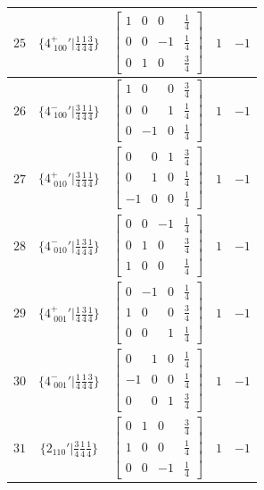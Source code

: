 \documentclass[fleqn,8pt]{jsarticle}
\begin{document}
\begin{longtable}{ccccc}
$ 25 $ & $ \{4^{+}_{\,\,100}{}'|\frac{1}{4} \frac{1}{4} \frac{3}{4}\} $ & $ \begin{bmatrix} 1 & 0 & 0 & \frac{1}{4} \\ 0 & 0 & -1 & \frac{1}{4} \\ 0 & 1 & 0 & \frac{3}{4} \end{bmatrix} $ & $ 1 $ & $ -1 $ \\ \hline
$ 26 $ & $ \{4^{-}_{\,\,100}{}'|\frac{3}{4} \frac{1}{4} \frac{1}{4}\} $ & $ \begin{bmatrix} 1 & 0 & 0 & \frac{3}{4} \\ 0 & 0 & 1 & \frac{1}{4} \\ 0 & -1 & 0 & \frac{1}{4} \end{bmatrix} $ & $ 1 $ & $ -1 $ \\ \hline
$ 27 $ & $ \{4^{+}_{\,\,010}{}'|\frac{3}{4} \frac{1}{4} \frac{1}{4}\} $ & $ \begin{bmatrix} 0 & 0 & 1 & \frac{3}{4} \\ 0 & 1 & 0 & \frac{1}{4} \\ -1 & 0 & 0 & \frac{1}{4} \end{bmatrix} $ & $ 1 $ & $ -1 $ \\ \hline
$ 28 $ & $ \{4^{-}_{\,\,010}{}'|\frac{1}{4} \frac{3}{4} \frac{1}{4}\} $ & $ \begin{bmatrix} 0 & 0 & -1 & \frac{1}{4} \\ 0 & 1 & 0 & \frac{3}{4} \\ 1 & 0 & 0 & \frac{1}{4} \end{bmatrix} $ & $ 1 $ & $ -1 $ \\ \hline
$ 29 $ & $ \{4^{+}_{\,\,001}{}'|\frac{1}{4} \frac{3}{4} \frac{1}{4}\} $ & $ \begin{bmatrix} 0 & -1 & 0 & \frac{1}{4} \\ 1 & 0 & 0 & \frac{3}{4} \\ 0 & 0 & 1 & \frac{1}{4} \end{bmatrix} $ & $ 1 $ & $ -1 $ \\ \hline
$ 30 $ & $ \{4^{-}_{\,\,001}{}'|\frac{1}{4} \frac{1}{4} \frac{3}{4}\} $ & $ \begin{bmatrix} 0 & 1 & 0 & \frac{1}{4} \\ -1 & 0 & 0 & \frac{1}{4} \\ 0 & 0 & 1 & \frac{3}{4} \end{bmatrix} $ & $ 1 $ & $ -1 $ \\ \hline
$ 31 $ & $ \{2{}_{110}{}'|\frac{3}{4} \frac{1}{4} \frac{1}{4}\} $ & $ \begin{bmatrix} 0 & 1 & 0 & \frac{3}{4} \\ 1 & 0 & 0 & \frac{1}{4} \\ 0 & 0 & -1 & \frac{1}{4} \end{bmatrix} $ & $ 1 $ & $ -1 $ \\ \hline

\end{longtable}
\end{document}
